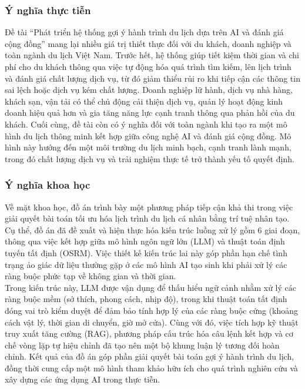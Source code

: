 \subsubsection{Ý nghĩa thực tiễn}
Đề tài “Phát triển hệ thống gợi ý hành trình du lịch dựa trên AI và đánh giá cộng đồng” mang lại nhiều giá trị thiết thực đối với du khách, doanh nghiệp và toàn ngành du lịch Việt Nam. Trước hết, hệ thống giúp tiết kiệm thời gian và chi phí cho du khách thông qua việc tự động hóa quá trình tìm kiếm, lên lịch trình và đánh giá chất lượng dịch vụ, từ đó giảm thiểu rủi ro khi tiếp cận các thông tin sai lệch hoặc dịch vụ kém chất lượng. Doanh nghiệp lữ hành, dịch vụ nhà hàng, khách sạn, vận tải có thể chủ động cải thiện dịch vụ, quản lý hoạt động kinh doanh hiệu quả hơn và gia tăng năng lực cạnh tranh thông qua phản hồi của du khách. Cuối cùng, đề tài còn có ý nghĩa đối với toàn ngành khi tạo ra một mô hình du lịch thông minh kết hợp giữa công nghệ AI và đánh giá cộng đồng. Mô hình này hướng đến một môi trường du lịch minh bạch, cạnh tranh lành mạnh, trong đó chất lượng dịch vụ và trải nghiệm thực tế trở thành yếu tố quyết định.

\subsubsection{Ý nghĩa khoa học}
Về mặt khoa học, đồ án trình bày một phương pháp tiếp cận khả thi trong việc giải quyết bài toán tối ưu hóa lịch trình du lịch cá nhân bằng trí tuệ nhân tạo. Cụ thể, đồ án đã đề xuất và hiện thực hóa kiến trúc luồng xử lý gồm 6 giai đoạn, thông qua việc kết hợp giữa mô hình ngôn ngữ lớn (LLM) và thuật toán định tuyến tất định (OSRM). Việc thiết kế kiến trúc lai này góp phần hạn chế tình trạng ảo giác dữ liệu thường gặp ở các mô hình AI tạo sinh khi phải xử lý các ràng buộc phức tạp về không gian và thời gian. \\
Trong kiến trúc này, LLM được vận dụng để thấu hiểu ngữ cảnh nhằm xử lý các ràng buộc mềm (sở thích, phong cách, nhịp độ), trong khi thuật toán tất định đóng vai trò kiểm duyệt để đảm bảo tính hợp lý của các ràng buộc cứng (khoảng cách vật lý, thời gian di chuyển, giờ mở cửa). Cùng với đó, việc tích hợp kỹ thuật truy xuất tăng cường (RAG), phương pháp cấu trúc hóa câu lệnh kết hợp và cơ chế vòng lặp tự hiệu chỉnh đã tạo nên một bộ khung luận lý tương đối hoàn chỉnh. Kết quả của đồ án góp phần giải quyết bài toán gợi ý hành trình du lịch, đồng thời cung cấp một mô hình tham khảo hữu ích cho quá trình nghiên cứu và xây dựng các ứng dụng AI trong thực tiễn.

